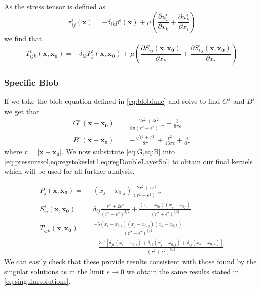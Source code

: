 As the stress tensor is defined as
\begin{equation}
\label{eq:regstress}
    \sigma_{ij}^\epsilon(\mathbf{x}) = -\delta_{ik}p^\epsilon(\mathbf{x}) + \mu\left( \frac{\partial u^\epsilon_i}{\partial x_k} + \frac{\partial u^\epsilon_k}{\partial x_i} \right)
\end{equation}
we find that
\begin{equation}
\label{eq:regDoubleLayerSol}
    T^\epsilon_{ijk}(\mathbf{x},\mathbf{x_0}) = -\delta_{ik} P^\epsilon_j(\mathbf{x},\mathbf{x_0}) + \mu\left( \frac{\partial S^\epsilon_{ij}(\mathbf{x},\mathbf{x_0})}{\partial x_k} + \frac{\partial S^\epsilon_{kj}(\mathbf{x},\mathbf{x_0})}{\partial x_i}\right)
\end{equation}

\subsubsection{Specific Blob}
If we take the blob equation defined in \cref{eq:blobfunc} and solve to find $G^\varepsilon$ and $B^\varepsilon$ we get that
\begin{subequations}
\begin{align}
    G^\varepsilon(\mathbf{x}-\mathbf{x_0}) &= \frac{-2r^2+3\epsilon^2}{8\pi(r^2+\epsilon^2)^{3/2}} + \frac{3}{8\pi\epsilon} \label{eq:G}\\
    B^\varepsilon(\mathbf{x}-\mathbf{x_0}) &= -\frac{\sqrt{\epsilon^2+r^2}}{8\pi} + \frac{r^2}{16\pi\epsilon} + \frac{\epsilon}{8\pi}\label{eq:B}
\end{align}
\end{subequations}
where $r=|\mathbf{x}-\mathbf{x_0}|$. We now substitute \cref{eq:G,eq:B} into \cref{eq:pressuresol,eq:regstokeslet1,eq:regDoubleLayerSol} to obtain our final kernels which will be used for all further analysis.

\begin{subequations}
\begin{align}
    P_j^\epsilon(\mathbf{x}, \mathbf{x_0}) =& (x_j-x_{0,j})\frac{2r^2+5\epsilon^2}{(r^2+\epsilon^2)^{5/2}} \label{eq:pressuresol2}\\
    S_{ij}^\epsilon(\mathbf{x}, \mathbf{x_0}) =& \delta_{ij} \frac{r^2+2\epsilon^2}{\left( r^2 + \epsilon^2 \right)^{3/2}} + \frac{(x_i-x_{0i})(x_j-x_{0j})}{\left( r^2 + \epsilon^2 \right)^{3/2}} \label{eq:regstokeslet2} \\
    T_{ijk}^\epsilon(\mathbf{x}, \mathbf{x_0}) =& \frac{-6(x_i-x_{0,i})(x_j-x_{0,j})(x_k-x_{0,k})}{(r^2+\epsilon^2)^{5/2}} \label{eq:doublelayer2}\\
    &-\frac{3\epsilon^2[\delta_{jk}(x_i-x_{0,i}) +\delta_{ik}(x_j-x_{0,j})+\delta_{ij}(x_k-x_{0,k})]}{(r^2+\epsilon^2)^{5/2}} \nonumber
\end{align}
\end{subequations}
We can easily check that these provide results consistent with those found by the singular solutions as in the limit $\epsilon \to 0$ we obtain the same results stated in \cref{eq:singularsolutions}.

